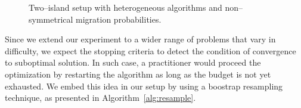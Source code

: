 \documentclass{sig-alternate}
\begin{document}
\begin{figure}[ht!]
    \label{graph:twoisl}
    \caption{Two--island setup with heterogeneous algorithms and non--symmetrical migration probabilities.}

\end{figure}
Since we extend our experiment to a wider range of problems that vary in difficulty, we expect the stopping criteria to detect the condition of convergence to suboptimal solution.
In such case, a practitioner would proceed the optimization by restarting the algorithm as long as the budget is not yet exhausted.
We embed this idea in our setup by using a boostrap resampling technique, as presented in Algorithm~\ref{alg:resample}.
\end{document}
